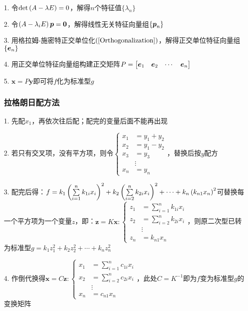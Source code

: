 \documentclass{article}
\begin{document}
1. 令$\det\left(A-\lambda E\right)=0$，解得$n$个特征值$\{\lambda_n\}$

2. 令$\left(A-\lambda_iE\right)\boldsymbol p=\boldsymbol 0$，解得线性无关特征向量组$\{\boldsymbol p_n\}$

3. 用格拉姆-施密特正交单位化$\left(\ref{Orthogonalization}\right)$，解得正交单位特征向量组$\{\boldsymbol e_n\}$

4. 用正交单位特征向量组构建正交矩阵$P=\begin{bmatrix}\boldsymbol e_1&\boldsymbol e_2&\cdots&\boldsymbol e_n\end{bmatrix}$

5. $\boldsymbol x=P\boldsymbol y$即可将$f$化为标准型$g$

\subsubsection{拉格朗日配方法}

1. 先配$x_1$，再依次往后配；配完的变量后面不能再出现

2. 若只有交叉项，没有平方项，则令$\left\{\begin{aligned}
        x_1 & =y_1+y_2 \\
        x_2 & =y_1-y_2 \\
        x_3 & =y_3     \\
            & \vdots   \\
        x_n & =y_n
    \end{aligned}\right.$，替换后按$y$配方

3. 配完后得：$f=k_1\left(\sum\limits_{i=1}^nk_{1i}x_i\right)^2+
    k_2\left(\sum\limits_{i=2}^nk_{2i}x_i\right)^2+\cdots+
    k_n\left(k_{n1}x_n\right)^2$可替换每一个平方项为一个变量$z$，即：$\boldsymbol z=K\boldsymbol x:\left\{\begin{aligned}
        z_1 & =\sum_{i=1}^nk_{1i}x_i \\
        z_2 & =\sum_{i=2}^nk_{2i}x_i \\
            & \vdots                 \\
        z_n & =k_{n1}x_n
    \end{aligned}\right.$，则原二次型已转为标准型$g=k_1z_1^2+k_2z_2^2+\cdots+k_nz_n^2$

4. 作倒代换得$\boldsymbol x=C\boldsymbol z:\left\{\begin{aligned}
        x_1 & =\sum_{i=1}^nc_{1i}x_i \\
        x_2 & =\sum_{i=2}^nc_{2i}x_i \\
            & \vdots                 \\
        x_n & =c_{n1}x_n
    \end{aligned}\right.$，此处$C=K^{-1}$即为$f$变为标准型$g$的变换矩阵
\end{document}
